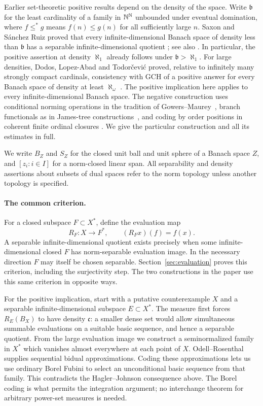 Earlier set-theoretic positive results depend on the density of the space.
Write $\mathfrak b$ for the least cardinality of a family in $\mathbb N^\mathbb N$
unbounded under eventual domination, where $f\leq^*g$ means
$f(n)\leq g(n)$ for all sufficiently large $n$.
Saxon and S\'anchez Ruiz proved that every infinite-dimensional Banach
space of density less than $\mathfrak b$ has a separable
infinite-dimensional quotient \cite{SaxonSanchezRuiz1996}; see also
\cite[Theorem~2.1]{Brech2025}. In particular, the positive assertion at
density $\aleph_1$ already follows under $\mathfrak b>\aleph_1$.
For large densities, Dodos, Lopez-Abad and
Todor\v{c}evi\'c proved, relative to infinitely many strongly compact
cardinals, consistency with GCH of a positive answer for every Banach
space of density at least $\aleph_\omega$
\cite{DodosLopezAbadTodorcevic2011}. The positive implication here applies
to every infinite-dimensional Banach space. The negative construction
uses conditional norming operations in the tradition of
Gowers--Maurey~\cite{GowersMaurey1993}, branch functionals as in
James-tree constructions~\cite{James1974,ArgyrosArvanitakisTolias2006},
and coding by order positions in coherent finite ordinal closures
\cite[Section~2.4]{ArgyrosLopezAbadTodorcevic2005}.
We give the particular construction and all its estimates in full.

We write $B_Z$ and $S_Z$ for the closed unit ball and unit sphere of a
Banach space $Z$, and $[z_i:i\in I]$ for a norm-closed linear span.
All separability and density assertions about subsets of dual spaces
refer to the norm topology unless another topology is specified.

\paragraph{The common criterion.}
For a closed subspace $F\subset X^*$, define the evaluation map
\[
 R_F:X\longrightarrow F^*,\qquad (R_Fx)(f)=f(x).
\]
A separable infinite-dimensional quotient exists precisely when some
infinite-dimensional closed $F$ has norm-separable evaluation image.
In the necessary direction $F$ may itself be chosen separable.
Section~\ref{sec:evaluation} proves this criterion, including the
surjectivity step.
The two constructions in the paper use this same criterion in opposite
ways.

For the positive implication, start with a putative counterexample $X$
and a separable infinite-dimensional subspace $E\subset X^*$.
The measure first forces $R_E(B_X)$ to have density $\mathfrak c$:
a smaller dense set would allow simultaneous summable evaluations on a
suitable basic sequence, and hence a separable quotient. From the large
evaluation image we construct a seminormalized family in $X^*$ which
vanishes almost everywhere at each point of $X$. Odell--Rosenthal supplies
sequential bidual approximations. Coding these approximations lets us use
ordinary Borel Fubini to select an unconditional basic sequence from that
family. This
contradicts the Hagler--Johnson consequence above. The Borel coding is
what permits the integration argument; no interchange theorem for
arbitrary power-set measures is needed.

